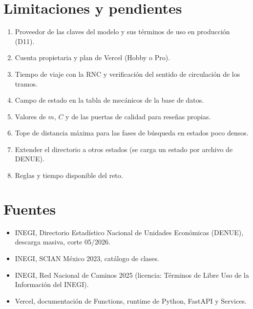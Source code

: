 \documentclass[11pt,a4paper]{article}
\begin{document}
\section{Limitaciones y pendientes}

\begin{enumerate}[nosep]
  \item Proveedor de las claves del modelo y sus términos de uso en producción (D11).
  \item Cuenta propietaria y plan de Vercel (Hobby o Pro).
  \item Tiempo de viaje con la RNC y verificación del sentido de circulación de los tramos.
  \item Campo de estado en la tabla de mecánicos de la base de datos.
  \item Valores de $m$, $C$ y de las puertas de calidad para reseñas propias.
  \item Tope de distancia máxima para las fases de búsqueda en estados poco densos.
  \item Extender el directorio a otros estados (se carga un estado por archivo de DENUE).
  \item Reglas y tiempo disponible del reto.
\end{enumerate}

\section*{Fuentes}
\begin{itemize}[nosep]
  \item INEGI, Directorio Estadístico Nacional de Unidades Económicas (DENUE), descarga masiva, corte 05/2026.
  \item INEGI, SCIAN México 2023, catálogo de clases.
  \item INEGI, Red Nacional de Caminos 2025 (licencia: Términos de Libre Uso de la Información del INEGI).
  \item Vercel, documentación de Functions, runtime de Python, FastAPI y Services.
\end{itemize}
\end{document}
